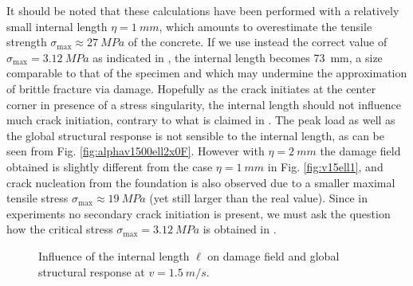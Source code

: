 It should be noted that these calculations have been performed with a relatively small internal length $\eta=\SI{1}{mm}$, which amounts to overestimate the tensile strength $\sigma_\mathrm{max}\approx \SI{27}{MPa}$ of the concrete. If we use instead the correct value of $\sigma_\mathrm{max}=\SI{3.12}{MPa}$ as indicated in \cite{OzboltBedeSharmaMayer:2015}, the internal length becomes \SI{73}{mm}, a size comparable to that of the specimen and which may undermine the approximation of brittle fracture via damage. Hopefully as the crack initiates at the center corner in presence of a stress singularity, the internal length should not influence much crack initiation, contrary to what is claimed in \cite{MesgarnejadBourdinKhonsari:2014}. The peak load as well as the global structural response is not sensible to the internal length, as can be seen from Fig. \ref{fig:alphav1500ell2x0F}. However with $\eta=\SI{2}{mm}$ the damage field obtained is slightly different from the case $\eta=\SI{1}{mm}$ in Fig. \ref{fig:v15ell1}, and crack nucleation from the foundation is also observed due to a smaller maximal tensile stress $\sigma_\mathrm{max}\approx \SI{19}{MPa}$ (yet still larger than the real value). Since in experiments no secondary crack initiation is present, we must ask the question how the critical stress $\sigma_\mathrm{max}=\SI{3.12}{MPa}$ is obtained in \cite{OzboltBedeSharmaMayer:2015}.
\begin{figure}[htbp]
\centering
\caption{Influence of the internal length $\ell$ on damage field and global structural response at $v=\SI{1.5}{m/s}$.}
\end{figure}

